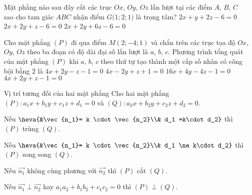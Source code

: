 \begin{ex}%
	Mặt phẳng nào sau đây cắt các trục $Ox$, $Oy$, $Oz$ lần lượt tại các điểm $A$, $B$, $C$ sao cho tam giác $ABC$ nhận điểm $G\big(1; 2; 1\big)$ là trọng tâm?
	{\True $2x + y + 2z  - 6 = 0$}
	{$2x + 2y + z  - 6 = 0$}
	{$2x + 2y + 6z - 6 = 0$} 
\end{ex}
\begin{ex}%
	Cho mặt phẳng  $\left(P\right)$ đi qua điểm $M\left(2; - 4; 1\right)$  và chắn trên các trục tọa độ $Ox$, $Oy$, $Oz$ theo ba đoạn có độ dài đại số lần lượt là $a$, $b$, $c$. Phương trình tổng quát của mặt phẳng $\left(P\right)$ khi $a$, $b$, $c$ theo thứ tự tạo thành một cấp số nhân có công bội bằng $2$ là 
	\choice
	{$4x + 2y - z - 1 = 0$}
	{$4x -  2y + z +  1 = 0$}
	{$16x + 4y - 4z - 1 = 0$}
	{\True $4x + 2y +  z - 1 = 0$}
\end{ex}

\begin{dang}{Vị trí tương đối của hai mặt phẳng}
	Cho hai mặt phẳng $(P) \colon a_1x+b_1y+c_1z+d_1=0$ và $(Q) \colon a_2x+b_2y+c_2z+d_2=0$.
		\begin{listEX}[1]
		\item [\ding{172}] Nếu $\heva{&\vec{n_1}= k \cdot \vec{n_2}\\& d_1 =k\cdot d_2}$ thì $(P)$ trùng $(Q)$.
		\item [\ding{173}] Nếu $\heva{&\vec{n_1}= k \cdot \vec{n_2}\\& d_1 \ne k\cdot d_2}$ thì $(P)$ song song $(Q)$.
		\item [\ding{174}] Nếu $\vec{n_1}$ không cùng phương với $\vec{n_2}$ thì $(P)$ cắt $(Q)$.
		\item [\ding{175}] Nếu $\vec{n_1} \perp \vec{n_2}$ hay $a_1a_2+b_1b_2+c_1c_2=0$ thì $(P) \perp (Q)$.
	\end{listEX}
\end{dang}
\setcounter{ex}{0}
\setcounter{vd}{0}

